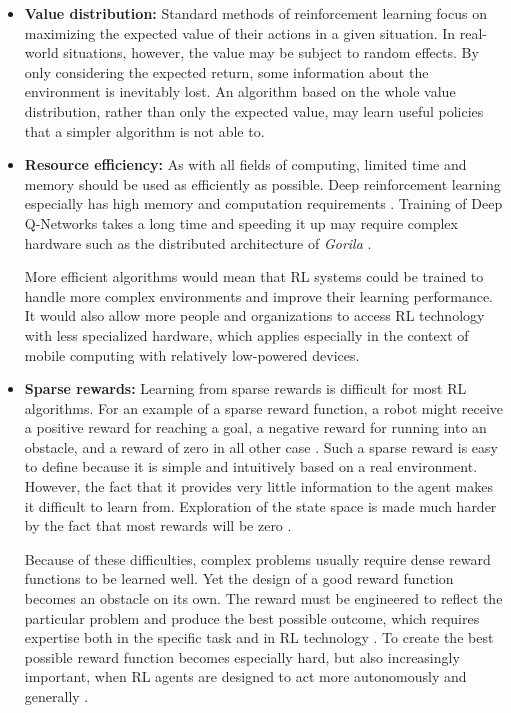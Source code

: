 \documentclass[runningheads]{llncs}
\begin{document}
\begin{itemize}

    \item \textbf{Value distribution:} Standard methods of reinforcement learning focus on maximizing the expected value of their actions in a given situation. In real-world situations, however, the value may be subject to random effects. By only considering the expected return, some information about the environment is inevitably lost. An algorithm based on the whole value distribution, rather than only the expected value, may learn useful policies that a simpler algorithm is not able to.

    \item \textbf{Resource efficiency:} As with all fields of computing, limited time and memory should be used as efficiently as possible. Deep reinforcement learning especially has high memory and computation requirements \cite{mnih2016asynchronous}. Training of Deep Q-Networks takes a long time and speeding it up may require complex hardware such as the distributed architecture of \textit{Gorila} \cite{nair2015massively}.
    
    More efficient algorithms would mean that RL systems could be trained to handle more complex environments and improve their learning performance. It would also allow more people and organizations to access RL technology with less specialized hardware, which applies especially in the context of mobile computing with relatively low-powered devices. 
    
    \item \textbf{Sparse rewards:} Learning from sparse rewards is difficult for most RL algorithms. For an example of a sparse reward function, a robot might receive a positive reward for reaching a goal, a negative reward for running into an obstacle, and a reward of zero in all other case \cite{smart2002effective}. Such a sparse reward is easy to define because it is simple and intuitively based on a real environment. However, the fact that it provides very little information to the agent makes it difficult to learn from. Exploration of the state space is made much harder by the fact that most rewards will be zero \cite{smart2002effective}.
    
    Because of these difficulties, complex problems usually require dense reward functions to be learned well. Yet the design of a good reward function becomes an obstacle on its own. The reward must be engineered to reflect the particular problem and produce the best possible outcome, which requires expertise both in the specific task and in RL technology \cite{andrychowicz2017hindsight}. To create the best possible reward function becomes especially hard, but also increasingly important, when RL agents are designed to act more autonomously and generally \cite{dewey2014reinforcement}.
    

\end{itemize}
\end{document}
